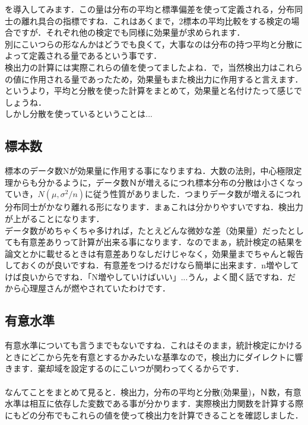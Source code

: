 \documentclass[11pt,a4paper]{ujreport} 	%
\begin{document}
を導入してみます．この量は分布の平均と標準偏差を使って定義される，分布同士の離れ具合の指標ですね．これはあくまで，2標本の平均比較をする検定の場合ですが．それぞれ他の検定でも同様に効果量が求められます．\\

別にこいつらの形なんかはどうでも良くて，大事なのは分布の持つ平均と分散によって定義される量であるという事です．\\

検出力の計算には実際これらの値を使ってましたよね．で，当然検出力はこれらの値に作用される量であったため，効果量もまた検出力に作用すると言えます．というより，平均と分散を使った計算をまとめて，効果量と名付けたって感じでしょうね．\\

しかし分散を使っているということは...

\subsection{標本数}
標本のデータ数Nが効果量に作用する事になりますね．大数の法則，中心極限定理からも分かるように，データ数Ｎが増えるにつれ標本分布の分散は小さくなっていき，$N(\mu, {\sigma}^2/n)$に従う性質がありました．つまりデータ数が増えるにつれ分布同士がかなり離れる形になります．まぁこれは分かりやすいですね．検出力が上がることになります．\\

データ数がめちゃくちゃ多ければ，たとえどんな微妙な差（効果量）だったとしても有意差ありって計算が出来る事になります．なのでまぁ，統計検定の結果を論文とかに載せるときは有意差ありなしだけじゃなく，効果量までちゃんと報告しておくのが良いですね．有意差をつけるだけなら簡単に出来ます．n増やしてけば良いからですね．「N増やしていけばいい」...うん，よく聞く話ですね．だから心理屋さんが燃やされていたわけです．\\

\subsection{有意水準}
有意水準についても言うまでもないですね．これはそのまま，統計検定にかけるときにどこから先を有意とするかみたいな基準なので，検出力にダイレクトに響きます．棄却域を設定するのにこいつが関わってくるからです．\\\\

なんてことをまとめて見ると．検出力，分布の平均と分散(効果量)，Ｎ数，有意水準は相互に依存した変数である事が分かります．実際検出力関数を計算する際にもどの分布でもこれらの値を使って検出力を計算できることを確認しました．\\
\end{document}
